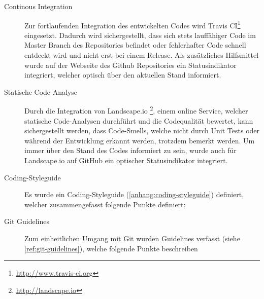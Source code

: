 \begin{description}
	\item[Continous Integration] Zur fortlaufenden Integration des entwickelten
	Codes wird Travis CI\footnote{\url{http://www.travis-ci.org}} eingesetzt.
	Dadurch wird sichergestellt, dass sich stets lauffähiger Code im Master Branch
	des Repositories befindet oder fehlerhafter Code schnell entdeckt wird und
	nicht erst bei einem Release. Als zusätzliches Hilfsmittel wurde auf der
	Webseite des Github Repositories ein Statusindikator integriert, welcher
	optisch über den aktuellen Stand informiert.

	\item[Statische Code-Analyse] Durch die Integration von Landscape.io
	\footnote{\url{http://landscape.io}}, einem online Service, welcher statische
	Code-Analysen durchführt und die Codequalität bewertet, kann sichergestellt
	werden, dass Code-Smells, welche nicht durch Unit Tests oder während der
	Entwicklung erkannt werden, trotzdem bemerkt werden. Um immer über den Stand
	des Codes informiert zu sein, wurde auch für Landscape.io auf GitHub ein
	optischer Statusindikator integriert.

	\item[Coding-Styleguide] Es wurde ein Coding-Styleguide
	(\autoref{anhang:coding-styleguide}) definiert, welcher zusammengefasst folgende
	Punkte definiert:

	\item[Git Guidelines] Zum einheitlichen Umgang mit Git wurden Guidelines
	verfasst (siehe \autoref{ref:git-guidelines}), welche folgende Punkte
	beschreiben

\end{description}


